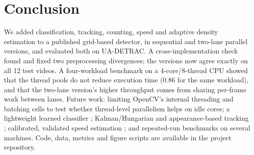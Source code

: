\documentclass[conference]{IEEEtran}
\begin{document}
\section{Conclusion}
\label{sec:conclusion}
We added classification, tracking, counting, speed and adaptive density
estimation to a published grid-based detector, in sequential and
two-lane parallel versions, and evaluated both on UA-DETRAC. A
cross-implementation check found and fixed two preprocessing divergences;
the versions now agree exactly on all 12 test videos. A four-workload
benchmark on a 4-core/8-thread CPU showed that the thread pools do not
reduce execution time (0.86 for the same workload), and that the
two-lane version's higher throughput comes from sharing per-frame work
between lanes. Future work: limiting OpenCV's internal threading and
batching cells to test whether thread-level parallelism helps on idle
cores; a lightweight learned classifier \cite{chang2025,macko2025};
Kalman/Hungarian and appearance-based tracking \cite{bewley2016,wojke2017};
calibrated, validated speed estimation \cite{kamil2024}; and repeated-run
benchmarks on several machines. Code, data, metrics and figure scripts
are available in the project repository.
\end{document}
